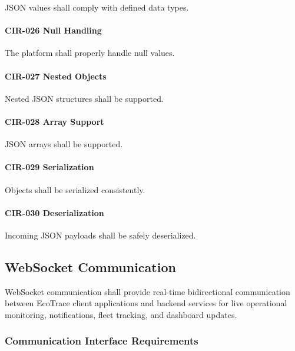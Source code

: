 JSON values shall comply with defined data types.

\paragraph{CIR-026 Null Handling}

The platform shall properly handle null values.

\paragraph{CIR-027 Nested Objects}

Nested JSON structures shall be supported.

\paragraph{CIR-028 Array Support}

JSON arrays shall be supported.

\paragraph{CIR-029 Serialization}

Objects shall be serialized consistently.

\paragraph{CIR-030 Deserialization}

Incoming JSON payloads shall be safely deserialized.


\subsection{WebSocket Communication}

WebSocket communication shall provide real-time bidirectional
communication between EcoTrace client applications and backend services
for live operational monitoring, notifications, fleet tracking, and
dashboard updates.


\subsubsection*{Communication Interface Requirements}

